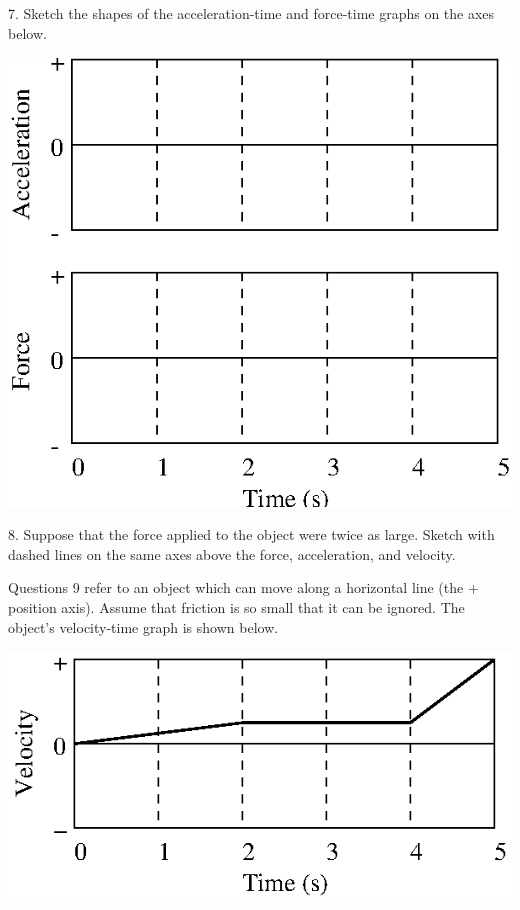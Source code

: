 7. Sketch the shapes of the acceleration-time and force-time graphs on the axes
below.

\vspace{0.3cm}
{\par\centering \includegraphics{force1_fig9.eps} \par}
\vspace{0.3cm}

8. Suppose that the force applied to the object were twice as large. Sketch
with dashed lines on the same axes above the force, acceleration, and velocity.

Questions 9 refer to an object which can move along a horizontal line (the +
position axis). Assume that friction is so small that it can be ignored. The
object's velocity-time graph is shown below.

\vspace{0.3cm}
{\par\centering \includegraphics{force1_fig12.eps} \par}
\vspace{0.3cm}

